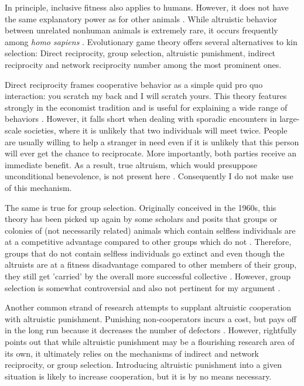 \documentclass[12pt]{article}
\begin{document}
In principle, inclusive fitness also applies to humans. However, it does not have the same explanatory power as for other animals \citep{Abbot2013}. While altruistic behavior between unrelated nonhuman animals is extremely rare, it occurs frequently among \textit{homo sapiens} \citep{Axelrod1981,Fehr2002}. Evolutionary game theory offers several alternatives to kin selection: Direct reciprocity, group selection, altruistic punishment, indirect reciprocity and network reciprocity number among the most prominent ones.

Direct reciprocity frames cooperative behavior as a simple quid pro quo interaction: you scratch my back and I will scratch yours. This theory features strongly in the economist tradition and is useful for explaining a wide range of behaviors \citep{Axelrod1981,Fehr2002}. However, it falls short when dealing with sporadic encounters in large-scale societies, where it is unlikely that two individuals will meet twice. People are usually willing to help a stranger in need even if it is unlikely that this person will ever get the chance to reciprocate. More importantly, both parties receive an immediate benefit. As a result, true altruism, which would presuppose unconditional benevolence, is not present here \citep{Fehr2000}. Consequently I do not make use of this mechanism.

The same is true for group selection. Originally conceived in the 1960s, this theory has been picked up again by some scholars and posits that groups or colonies of (not necessarily related) animals which contain selfless individuals are at a competitive advantage compared to other groups which do not \citep{Heschl1994}. Therefore, groups that do not contain selfless individuals go extinct and even though the altruists are at a fitness disadvantage compared to other members of their group, they still get 'carried' by the overall more successful collective \citep{samir2009}. However, group selection is somewhat controversial and also not pertinent for my argument \citep{Abbot2013}.

Another common strand of research attempts to supplant altruistic cooperation with altruistic punishment. Punishing non-cooperators incurs a cost, but pays off in the long run because it decreases the number of defectors \citep{Fehr2002,boyd2003}. However, \cite{Nowak2006a} rightfully points out that while altruistic punishment may be a flourishing research area of its own, it ultimately relies on the mechanisms of indirect and network reciprocity, or group selection. Introducing altruistic punishment into a given situation is likely to increase cooperation, but it is by no means necessary.
\end{document}
